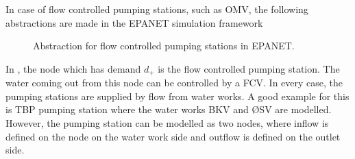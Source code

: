 In case of flow controlled pumping stations, such as OMV, the following abstractions are made in the EPANET simulation framework 

\begin{figure}[H]
\centering
 
\caption{Abstraction for flow controlled pumping stations in EPANET.}
\label{fig:FCV_EPANET}
\end{figure}

\vspace{-3mm}

In , the node which has demand $d_+$ is the flow controlled pumping station. The water coming out from this node can be controlled by a FCV. In every case, the pumping stations are supplied by flow from water works. A good example for this is TBP pumping station where the water works BKV and ØSV are modelled. However, the pumping station can be modelled as two nodes, where inflow is defined on the node on the water work side and outflow is defined on the outlet side. 







